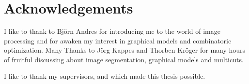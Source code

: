 




\begingroup

\let\clearpage\relax
\let\cleardoublepage\relax
\let\cleardoublepage\relax

\chapter*{Acknowledgements} %

\noindent I like to thank to Bj\"orn Andres for introducing me to the world of image processing 
and for awaken my interest in graphical models and combinatoric optimization.
\noindent Many Thanks to J\"org Kappes and Thorben Kr\"oger  for many hours of fruitful discussing about image segmentation,
graphical models and multicuts.

I like to thank my supervisors, \myProf and \myOtherProf which made this thesis possible.


\endgroup